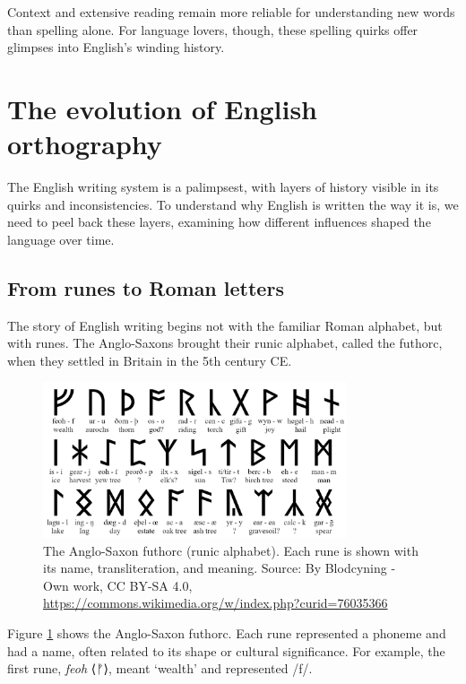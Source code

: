 Context and extensive reading remain more reliable for understanding new words than spelling alone. For language lovers, though, these spelling quirks offer glimpses into English's winding history.

\section{The evolution of English orthography}

The English writing system is a palimpsest, with layers of history visible in its quirks and inconsistencies. To understand why English is written the way it is, we need to peel back these layers, examining how different influences shaped the language over time.

\subsection{From runes to Roman letters}

The story of English writing begins not with the familiar Roman alphabet, but with runes. The Anglo-Saxons brought their runic alphabet, called the futhorc, when they settled in Britain in the 5th century CE.

\begin{figure}[h]
\centering
\includegraphics[width=0.8\textwidth]{figures/Futhorc_Rune_Chart.png}
\caption{The Anglo-Saxon futhorc (runic alphabet). Each rune is shown with its name, transliteration, and meaning. Source: By Blodcyning - Own work, CC BY-SA 4.0, \url{https://commons.wikimedia.org/w/index.php?curid=76035366}}
\label{fig:futhorc}
\end{figure}

Figure \ref{fig:futhorc} shows the Anglo-Saxon futhorc. Each rune represented a phoneme and had a name, often related to its shape or cultural significance. For example, the first rune, \textit{feoh} ⟨ᚠ⟩, meant `wealth' and represented /f/. 

